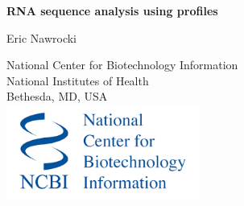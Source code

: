 \documentclass[landscape]{slides}
\begin{document}
\begin{slide}
\begin{center}
\large{\textbf{RNA sequence analysis using profiles}}

\normalsize

Eric Nawrocki

National Center for Biotechnology Information\\
National Institutes of Health\\
Bethesda, MD, USA\\

\vspace{1in}
\includegraphics[width=2.5in]{figs/ncbi-logo}


\medskip

\medskip

\small



\end{center}
\end{slide}
\end{document}
